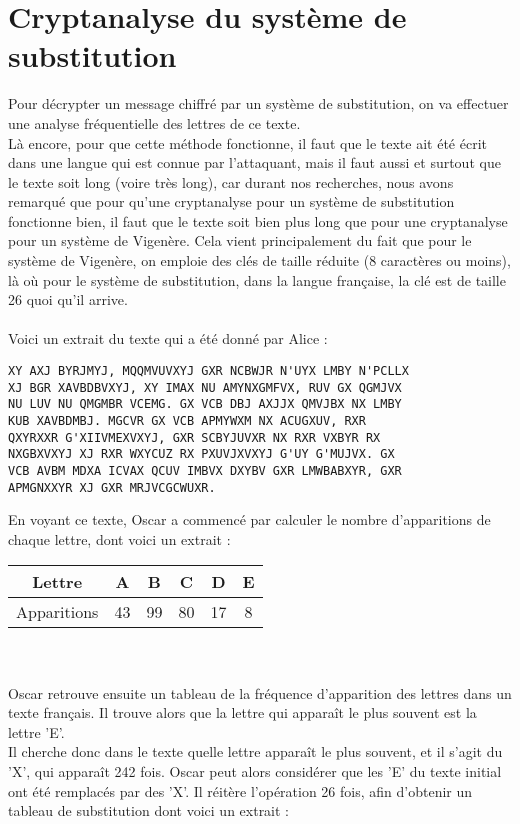 	\section{Cryptanalyse du système de substitution}
		Pour décrypter un message chiffré par un système de substitution, on va effectuer une analyse fréquentielle des lettres de ce texte.\\
		Là encore, pour que cette méthode fonctionne, il faut que le texte ait été écrit dans une langue qui est connue par l'attaquant, mais il faut aussi et surtout que le texte soit long (voire très long), car durant nos recherches, nous avons remarqué que pour qu'une cryptanalyse pour un système de substitution fonctionne bien, il faut que le texte soit bien plus long que pour une cryptanalyse pour un système de Vigenère. Cela vient principalement du fait que pour le système de Vigenère, on emploie des clés de taille réduite (8 caractères ou moins), là où pour le système de substitution, dans la langue française, la clé est de taille 26 quoi qu'il arrive.\\
		\\
		Voici un extrait du texte qui a été donné par Alice :
		\begin{lstlisting}
XY AXJ BYRJMYJ, MQQMVUVXYJ GXR NCBWJR N'UYX LMBY N'PCLLX
XJ BGR XAVBDBVXYJ, XY IMAX NU AMYNXGMFVX, RUV GX QGMJVX
NU LUV NU QMGMBR VCEMG. GX VCB DBJ AXJJX QMVJBX NX LMBY
KUB XAVBDMBJ. MGCVR GX VCB APMYWXM NX ACUGXUV, RXR
QXYRXXR G'XIIVMEXVXYJ, GXR SCBYJUVXR NX RXR VXBYR RX
NXGBXVXYJ XJ RXR WXYCUZ RX PXUVJXVXYJ G'UY G'MUJVX. GX
VCB AVBM MDXA ICVAX QCUV IMBVX DXYBV GXR LMWBABXYR, GXR
APMGNXXYR XJ GXR MRJVCGCWUXR.
		\end{lstlisting}
		En voyant ce texte, Oscar a commencé par calculer le nombre d'apparitions de chaque lettre, dont voici un extrait :\\
		\begin{tabular}{ | c | c | c | c | c | c | }
			\hline
			Lettre & A & B & C & D & E\\ \hline
			Apparitions & 43 & 99 & 80 & 17 & 8\\
			\hline
		\end{tabular}\\
		\\
		Oscar retrouve ensuite un tableau de la fréquence d'apparition des lettres dans un texte français. Il trouve alors que la lettre qui apparaît le plus souvent est la lettre 'E'.\\
		Il cherche donc dans le texte quelle lettre apparaît le plus souvent, et il s'agit du 'X', qui apparaît 242 fois. Oscar peut alors considérer que les 'E' du texte initial ont été remplacés par des 'X'. Il réitère l'opération 26 fois, afin d'obtenir un tableau de substitution dont voici un extrait :\\
